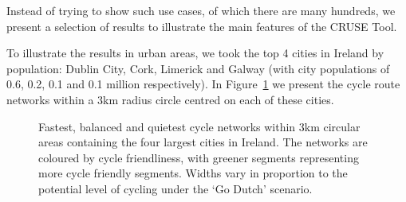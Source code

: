 \documentclass[
  super,
  preprint,
  3p]{elsarticle}
\providecommand{\DIFaddbeginFL}{} %
\providecommand{\DIFaddendFL}{} %
\providecommand{\DIFdelbeginFL}{} %
\providecommand{\DIFdelendFL}{} %
\newcommand{\DIFscaledelfig}{0.5}
\newlength{\DIFdelgraphicswidth} %
\newlength{\DIFdelgraphicsheight} %
\newcommand{\DIFaddincludegraphics}[2][]{{\color{blue}\fbox{\DIFOincludegraphics[#1]{#2}}}} %
\newcommand{\DIFdelincludegraphics}[2][]{%
\sbox{\DIFdelgraphicsbox}{\DIFOincludegraphics[#1]{#2}}%
\settoboxwidth{\DIFdelgraphicswidth}{\DIFdelgraphicsbox} %
\settoboxtotalheight{\DIFdelgraphicsheight}{\DIFdelgraphicsbox} %
\scalebox{\DIFscaledelfig}{%
\parbox[b]{\DIFdelgraphicswidth}{\usebox{\DIFdelgraphicsbox}\\[-\baselineskip] \rule{\DIFdelgraphicswidth}{0em}}\llap{\resizebox{\DIFdelgraphicswidth}{\DIFdelgraphicsheight}{%
\setlength{\unitlength}{\DIFdelgraphicswidth}%
\begin{picture}(1,1)%
\thicklines\linethickness{2pt} %
{\color[rgb]{1,0,0}\put(0,0){\framebox(1,1){}}}%
{\color[rgb]{1,0,0}\put(0,0){\line( 1,1){1}}}%
{\color[rgb]{1,0,0}\put(0,1){\line(1,-1){1}}}%
\end{picture}%
}\hspace*{3pt}}} %
} %
\DeclareRobustCommand{\DIFaddbeginFL}{\DIFOaddbeginFL \let\includegraphics\DIFaddincludegraphics} %
\DeclareRobustCommand{\DIFaddendFL}{\DIFOaddendFL \let\includegraphics\DIFOincludegraphics} %
\DeclareRobustCommand{\DIFdelbeginFL}{\DIFOdelbeginFL \let\includegraphics\DIFdelincludegraphics} %
\DeclareRobustCommand{\DIFdelendFL}{\DIFOaddendFL \let\includegraphics\DIFOincludegraphics} %
\begin{document}
Instead of trying to show such use cases, of which there are many
hundreds, we present a selection of results to illustrate the main
features of the CRUSE Tool.

To illustrate the results in urban areas, we took the top 4 cities in
Ireland by population: Dublin City, Cork, Limerick and Galway (with city
populations of 0.6, 0.2, 0.1 and 0.1 million respectively). In
Figure~\ref{fig-city-results} we present the cycle route networks within
a 3km radius circle centred on each of these cities.

\begin{figure}

\DIFdelbeginFL %


\DIFdelendFL \DIFaddbeginFL {}
\DIFaddendFL 

\caption{\label{fig-city-results}Fastest, balanced and quietest cycle
networks within 3km circular areas containing the four largest cities in
Ireland. The networks are coloured by cycle friendliness, with greener
segments representing more cycle friendly segments. Widths vary in
proportion to the potential level of cycling under the `Go Dutch'
scenario.}

\end{figure}%
\end{document}
